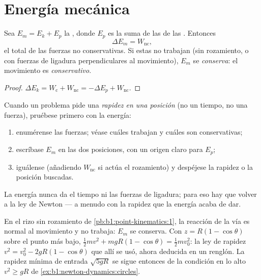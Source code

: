 \section{Energía mecánica}

\begin{theorem}\label{thm:b1:work-and-energy:em}
Sea $E_m = E_k + E_p$ la \emph{}, donde $E_p$ es la suma
de las  de las . Entonces
\[
\Delta E_m = W_{\text{nc}} ,
\]
el  total de las fuerzas no conservativas. Si estas no trabajan
(sin rozamiento, o con fuerzas de ligadura perpendiculares al
movimiento), $E_m$ se \emph{conserva}: el movimiento es \emph{conservativo}.
\end{theorem}

\begin{proof}
$\Delta E_k = W_{\text{c}} + W_{\text{nc}} = -\Delta E_p + W_{\text{nc}}$.
\end{proof}

\begin{method}\label{met:b1:work-and-energy:method}
Cuando un problema pide una \emph{rapidez en una posición} (no un tiempo,
no una fuerza), pruébese primero con la energía:
\begin{enumerate}
  \item enumérense las fuerzas; véase cuáles trabajan y cuáles son
        conservativas;
  \item escríbase $E_m$ en las dos posiciones, con un origen claro para $E_p$;
  \item iguálense (añadiendo $W_{\text{nc}}$ si actúa el rozamiento) y
        despéjese la rapidez o la posición buscadas.
\end{enumerate}
La energía nunca da el tiempo ni las fuerzas de ligadura; para eso hay que
volver a la ley de Newton --- a menudo con la rapidez que la energía acaba de dar.
\end{method}

\begin{example}\label{ex:b1:work-and-energy:loop}
En el rizo sin rozamiento de \cref{pb:b1:point-kinematics:1}, la reacción
de la vía es normal al movimiento y no trabaja: $E_m$ se conserva. Con
$z = R(1 - \cos\theta)$ sobre el punto más bajo, $\tfrac12 mv^2 + mgR(1 -
\cos\theta) = \tfrac12 mv_0^2$: la ley de rapidez $v^2 = v_0^2 - 2gR(1 -
\cos\theta)$ que allí se usó, ahora deducida en un renglón. La rapidez
mínima de entrada $\sqrt{5gR}$ se sigue entonces de la condición en lo
alto $v^2 \geq gR$ de \cref{ex:b1:newton-dynamics:circles}.
\end{example}


